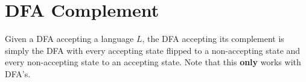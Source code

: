 \documentclass[11pt]{article}
\begin{document}
\section{DFA Complement}
	Given a DFA accepting a language $L$, the DFA accepting its complement is simply the DFA with every accepting state flipped to a non-accepting state and every non-accepting state to an accepting state. Note that this \textbf{only} works with DFA's.

%		
%		


\end{document}
